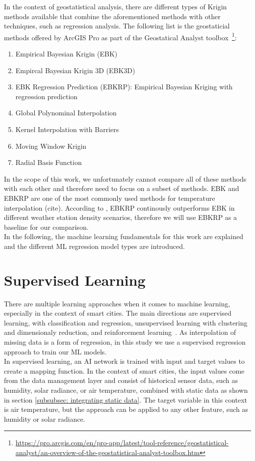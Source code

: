 In the context of geostatistical analysis, there are different types of Krigin methods available that combine the aforementioned methods with other techniques, such as regression analysis. The following list is the geostaticial methods offered by ArcGIS Pro as part of the Geostatical Analyst toolbox~\footnote{\url{https://pro.arcgis.com/en/pro-app/latest/tool-reference/geostatistical-analyst/an-overview-of-the-geostatistical-analyst-toolbox.htm}}:

\begin{enumerate}
    \item Empirical Bayesian Krigin (EBK)
    \item Empircal Bayesian Krigin 3D (EBK3D)
    \item EBK Regression Prediction (EBKRP): Empirical Bayesian Kriging with regression prediction
    \item Global Polynominal Interpolation
    \item Kernel Interpolation with Barriers
    \item Moving Window Krigin
    \item Radial Basis Function
\end{enumerate}

In the scope of this work, we unfortunately cannot compare all of these methods with each other and therefore need to focus on a subset of methods. EBK and EBKRP are one of the most commonly used methods for temperature interpolation (cite). According to \cite{njoku2023effects}, EBKRP continously outperforms EBK in different weather station density scenarios, therefore we will use EBKRP as a baseline for our comparison.\\
In the following, the machine learning fundamentals for this work are explained and the different ML regression model types are introduced.

\section{Supervised Learning}
There are multiple learning approaches when it comes to machine learning, especially in the context of smart cities. The main directions are supervised learning, with classification and regression, unsupervised learning with clustering and dimensionaly reduction, and reinforcement learning~\cite{ullah2020applications}. As interpolation of missing data is a form of regression, in this study we use a supervised regression approach to train our ML models.\\
In supervised learning, an AI network is trained with input and target values to create a mapping function. In the context of smart cities, the input values come from the data management layer and consist of historical sensor data, such as humidity, solar radiance, or air temperature, combined with static data as shown in section \ref{subsubsec: integrating static data}. The target variable in this context is air temperature, but the approach can be applied to any other feature, such as humidity or solar radiance.


